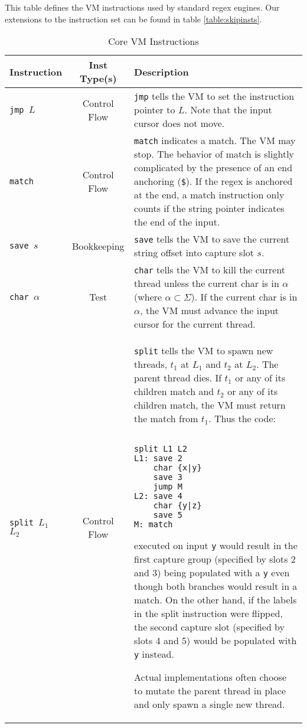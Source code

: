 \begin{table}[ht]
\centering
\caption{Core VM Instructions}
\label{table:insts}

This table defines the VM instructions used by standard regex engines.
Our extensions to the instruction set can be found in table
\ref{table:skipinsts}.
\begin{tabular}{| l | c | p{9cm} |} \hline
Instruction & Inst Type(s) & Description \\ \hline
{\tt jmp $L$} & Control Flow &
    \verb'jmp' tells the VM to set the instruction pointer
    to $L$. Note that the input cursor does not move. \\ \hline
{\tt match} & Control Flow &
    \verb'match' indicates a match. The VM may stop. The behavior of match
    is slightly complicated by the presence of an end anchoring
    (\verb'$'). If the regex is anchored at the end, a match instruction
    only counts if the string pointer indicates the end of the input.
    \\ \hline
{\tt save $s$} & Bookkeeping &
    \verb'save' tells the VM to save the current string
    offset into capture slot $s$. \\ \hline
{\tt char $\alpha$} & Test &
    \verb'char' tells the VM to kill the current thread unless
    the current char is in $\alpha$ (where $\alpha \subset \Sigma$).
    If the current char is in $\alpha$, the VM must advance the input cursor
    for the current thread. \\ \hline
{\tt split $L_1$ $L_2$} & Control Flow &
    \verb'split' tells the VM to spawn new threads, $t_1$ at $L_1$ 
    and $t_2$ at $L_2$. The parent thread dies.
    If $t_1$ or any of its children match and
    $t_2$ or any of its children match, the VM must return
    the match from $t_1$. Thus the code:
        \begin{verbatim}

split L1 L2
L1: save 2
    char {x|y}
    save 3
    jump M
L2: save 4
    char {y|z}
    save 5
M: match
        \end{verbatim}
    executed on input \verb'y' would result in the first capture group
    (specified by slots 2 and 3) being populated with a \verb'y'
    even though both branches would result in a match. On the
    other hand, if the labels in the split instruction were
    flipped, the second capture slot (specified by slots 4 and 5)
    would be populated with \verb'y' instead.

    Actual implementations often choose to mutate the parent thread in
    place and only spawn a single new thread.
    \\ \hline
\end{tabular}
\end{table}

